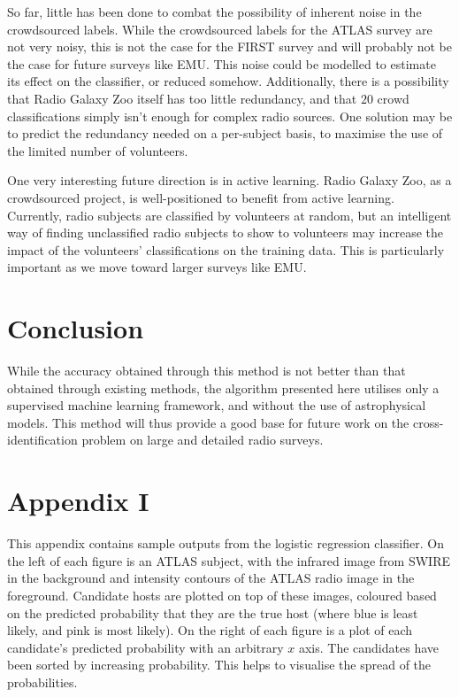 \documentclass[a4paper]{article}
\begin{document}
    So far, little has been done to combat the possibility of inherent noise in the crowdsourced labels. While the crowdsourced labels for the ATLAS survey are not very noisy, this is not the case for the FIRST survey and will probably not be the case for future surveys like EMU. This noise could be modelled to estimate its effect on the classifier, or reduced somehow. Additionally, there is a possibility that Radio Galaxy Zoo itself has too little redundancy, and that $20$ crowd classifications simply isn't enough for complex radio sources. One solution may be to predict the redundancy needed on a per-subject basis, to maximise the use of the limited number of volunteers.

    One very interesting future direction is in active learning. Radio Galaxy Zoo, as a crowdsourced project, is well-positioned to benefit from active learning. Currently, radio subjects are classified by volunteers at random, but an intelligent way of finding unclassified radio subjects to show to volunteers may increase the impact of the volunteers' classifications on the training data. This is particularly important as we move toward larger surveys like EMU.

  \section{Conclusion}

    While the accuracy obtained through this method is not better than that obtained through existing methods, the algorithm presented here utilises only a supervised machine learning framework, and without the use of astrophysical models. This method will thus provide a good base for future work on the cross-identification problem on large and detailed radio surveys.

  
  

  \newpage
  \section*{Appendix I}

    This appendix contains sample outputs from the logistic regression classifier. On the left of each figure is an ATLAS subject, with the infrared image from SWIRE in the background and intensity contours of the ATLAS radio image in the foreground. Candidate hosts are plotted on top of these images, coloured based on the predicted probability that they are the true host (where blue is least likely, and pink is most likely). On the right of each figure is a plot of each candidate's predicted probability with an arbitrary $x$ axis. The candidates have been sorted by increasing probability. This helps to visualise the spread of the probabilities.
\end{document}
